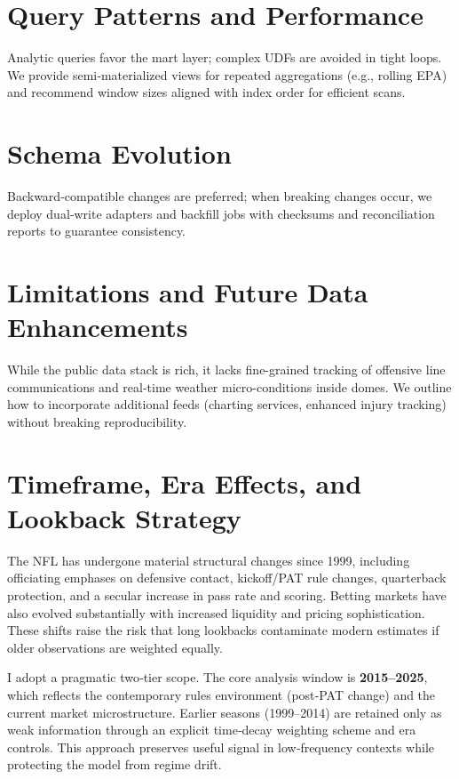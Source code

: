 \section{Query Patterns and Performance}
Analytic queries favor the mart layer; complex UDFs are avoided in tight loops. We provide semi‑materialized views for repeated aggregations (e.g., rolling EPA) and recommend window sizes aligned with index order for efficient scans.

\section{Schema Evolution}
Backward‑compatible changes are preferred; when breaking changes occur, we deploy dual‑write adapters and backfill jobs with checksums and reconciliation reports to guarantee consistency.

\section{Limitations and Future Data Enhancements}
While the public data stack is rich, it lacks fine-grained tracking of offensive line communications and real-time weather micro-conditions inside domes. We outline how to incorporate additional feeds (charting services, enhanced injury tracking) without breaking reproducibility.


\section{Timeframe, Era Effects, and Lookback Strategy}\label{sec:timeframe-lookback}
The NFL has undergone material structural changes since 1999, including officiating emphases on defensive contact, kickoff/PAT rule changes, quarterback protection, and a secular increase in pass rate and scoring. Betting markets have also evolved substantially with increased liquidity and pricing sophistication. These shifts raise the risk that long lookbacks contaminate modern estimates if older observations are weighted equally.

I adopt a pragmatic two‑tier scope. The core analysis window is \textbf{2015--2025}, which reflects the contemporary rules environment (post‑PAT change) and the current market microstructure. Earlier seasons (1999--2014) are retained only as weak information through an explicit time‑decay weighting scheme and era controls. This approach preserves useful signal in low‑frequency contexts while protecting the model from regime drift.

